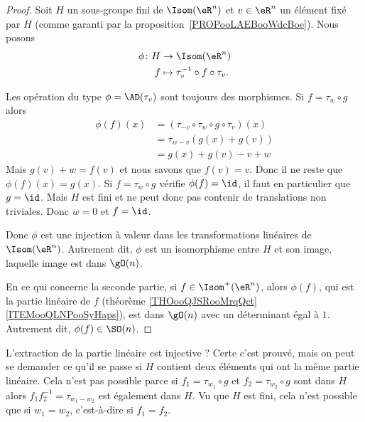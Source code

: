 \begin{proof}
	Soit \( H\) un sous-groupe fini de \( \Isom(\eR^n)\) et \( v\in \eR^n\) un élément fixé par \( H\) (comme garanti par la proposition~\ref{PROPooLAEBooWdcBoe}). Nous posons
	\begin{equation}
		\begin{aligned}
			\phi\colon H & \to \Isom(\eR^n)                        \\
			f            & \mapsto \tau_v^{-1}\circ f\circ \tau_v.
		\end{aligned}
	\end{equation}

	\begin{subproof}
		Les opération du type \( \phi=\AD(\tau_v)\) sont toujours des morphismes.
		Si \( f=\tau_w\circ g\) alors
		\begin{subequations}
			\begin{align}
				\phi(f)(x) & =(\tau_{-v}\circ\tau_w\circ g\circ\tau_v)(x) \\
				           & =\tau_{w-v}(   g(x)+g(v)  )                  \\
				           & =g(x)+g(v)-v+w
			\end{align}
		\end{subequations}
		Mais \( g(v)+w=f(v)\) et nous savons que \( f(v)=v\). Donc il ne reste que \( \phi(f)(x)=g(x)\).
		Si \( f=\tau_w\circ g\) vérifie \( \phi(f)=\id\), il faut en particulier que \( g=\id\). Mais \( H\) est fini et ne peut donc pas contenir de translations non triviales. Donc \( w=0\) et \( f=\id\).
	\end{subproof}
	Donc \( \phi\) est une injection à valeur dans les transformations linéaires de \( \Isom(\eR^n)\). Autrement dit, \( \phi\) est un isomorphisme entre \( H\) et son image, laquelle image est dans \( \gO(n)\).

	En ce qui concerne la seconde partie, si \( f\in\Isom^+(\eR^n)\), alors \( \phi(f)\), qui est la partie linéaire de \( f\) (théorème \ref{THOooQJSRooMrqQct}\ref{ITEMooQLNPooSyHaps}), est dans \( \gO(n)\) avec un déterminant égal à \( 1\). Autrement dit, \( \phi(f)\in\SO(n)\).
\end{proof}

L'extraction de la partie linéaire est injective ? Certe c'est prouvé, mais on peut se demander ce qu'il se passe si \( H\) contient deux éléments qui ont la même partie linéaire. Cela n'est pas possible parce si \( f_1=\tau_{w_1}\circ g\) et \( f_2=\tau_{w_2}\circ g\) sont dans \( H\) alors \( f_1f_2^{-1}=\tau_{w_1-w_2}\) est également dans \( H\). Vu que \( H\) est fini, cela n'est possible que si \( w_1=w_2\), c'est-à-dire si \( f_1=f_2\).


